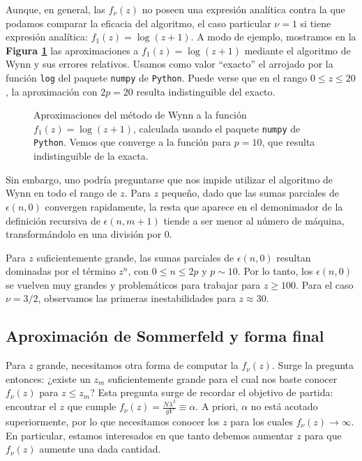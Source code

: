 Aunque, en general, las $f_\nu(z)$ no poseen una expresión analítica contra la que podamos comparar la eficacia del algoritmo, el caso particular $\nu=1$ si tiene
expresión analítica: $f_1(z) = \log(z+1)$.
A modo de ejemplo, mostramos en la \textbf{Figura \ref{fig:ej_wynn_log}} las aproximaciones a $f_1(z) = \log(z+1)$ mediante el algoritmo de Wynn y sus errores relativos.
Usamos como valor ``exacto'' el arrojado por la función \texttt{log} del paquete \texttt{numpy} de \texttt{Python}.
Puede verse que en el rango $0\leq z\leq 20$, la aproximación con $2p=20$ resulta indistinguible del exacto.

\begin{figure}[H]
	\centering
	\caption{Aproximaciones del método de Wynn a la función $f_1(z) = \log(z+1)$, calculada usando el paquete \texttt{numpy} de \texttt{Python}.
	Vemos que converge a la función para $p=10$, que resulta indistinguible de la exacta.}
	\label{fig:ej_wynn_log}
\end{figure}

Sin embargo, uno podría preguntarse que nos impide utilizar el algoritmo de Wynn en todo el rango de $z$.
Para $z$ pequeño, dado que las sumas parciales de $\epsilon(n,0)$ convergen rapidamente, la resta que aparece en el demonimador de la definición recursiva de
$\epsilon(n, m+1)$ tiende a ser menor al número de máquina, transformándolo en una división por $0$.

Para $z$ suficientemente grande, las sumas parciales de $\epsilon(n,0)$ resultan dominadas por el término $z^n$, con $0\leq n\leq 2p$ y $p\sim 10$.
Por lo tanto, los $\epsilon(n,0)$ se vuelven muy grandes y problemáticos para trabajar para $z\geq 100$.
Para el caso $\nu=3/2$, observamos las primeras inestabilidades para $z\approx 30$.


\subsection{Aproximación de Sommerfeld y forma final}

Para $z$ grande, necesitamos otra forma de computar la $f_\nu(z)$.
Surge la pregunta entonces: ¿existe un $z_m$ suficientemente grande para el cual nos baste conocer $f_\nu(z)$ para $z\leq z_m$?
Esta pregunta surge de recordar el objetivo de partida: encontrar el $z$ que cumple $f_\nu(z)=\frac{N\lambda^3}{gV}\equiv \alpha$.
A priori, $\alpha$ no está acotado superiormente, por lo que necesitamos conocer los $z$ para los cuales $f_\nu(z)\to\infty$.
En particular, estamos interesados en que tanto debemos aumentar $z$ para que $f_\nu(z)$ aumente una dada cantidad.

